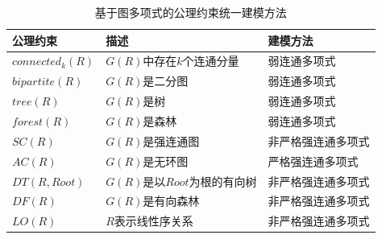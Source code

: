 \documentclass[12pt,UTF8,AutoFakeBold=3,a4paper]{ctexart} %
\begin{document}
\begin{table}[h]
  \centering
  \caption{基于图多项式的公理约束统一建模方法}\label{tab:axioms}
    \begin{tabular}{l|l|l}
      \hline
      \textbf{公理约束} & \textbf{描述} & \textbf{建模方法} \\
      \hline\hline
      $connected_k(R)$ & $G(R)$中存在$k$个连通分量 & 弱连通多项式 \\
      \hline
      $bipartite(R)$ & $G(R)$是二分图 & 弱连通多项式 \\
      \hline
      $tree(R)$ & $G(R)$是树 & 弱连通多项式 \\
      \hline
      $forest(R)$ & $G(R)$是森林 & 弱连通多项式 \\
      \hline\hline
      $SC(R)$ & $G(R)$是强连通图 & 非严格强连通多项式 \\
      \hline
      $AC(R)$ & $G(R)$是无环图 & 严格强连通多项式 \\
      \hline
      $DT(R, Root)$ & $G(R)$是以$Root$为根的有向树 & 非严格强连通多项式 \\ \hline
      $DF(R)$ & $G(R)$是有向森林 & 非严格强连通多项式 \\ \hline
      $LO(R)$ & $R$表示线性序关系 & 非严格强连通多项式 \\
      \hline
    \end{tabular}
\end{table}

\end{document}
